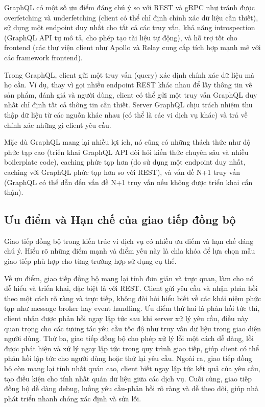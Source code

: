 GraphQL có một số ưu điểm đáng chú ý so với REST và gRPC như tránh được overfetching và underfetching (client có thể chỉ định chính xác dữ liệu cần thiết), sử dụng một endpoint duy nhất cho tất cả các truy vấn, khả năng introspection (GraphQL API tự mô tả, cho phép tạo tài liệu tự động), và hỗ trợ tốt cho frontend (các thư viện client như Apollo và Relay cung cấp tích hợp mạnh mẽ với các framework frontend).

Trong GraphQL, client gửi một truy vấn (query) xác định chính xác dữ liệu mà họ cần. Ví dụ, thay vì gọi nhiều endpoint REST khác nhau để lấy thông tin về sản phẩm, đánh giá và người dùng, client có thể gửi một truy vấn GraphQL duy nhất chỉ định tất cả thông tin cần thiết. Server GraphQL chịu trách nhiệm thu thập dữ liệu từ các nguồn khác nhau (có thể là các vi dịch vụ khác) và trả về chính xác những gì client yêu cầu.

Mặc dù GraphQL mang lại nhiều lợi ích, nó cũng có những thách thức như độ phức tạp cao (triển khai GraphQL API đòi hỏi kiến thức chuyên sâu và nhiều boilerplate code), caching phức tạp hơn (do sử dụng một endpoint duy nhất, caching với GraphQL phức tạp hơn so với REST), và vấn đề N+1 truy vấn (GraphQL có thể dẫn đến vấn đề N+1 truy vấn nếu không được triển khai cẩn thận).

\subsection{Ưu điểm và Hạn chế của giao tiếp đồng bộ}
Giao tiếp đồng bộ trong kiến trúc vi dịch vụ có nhiều ưu điểm và hạn chế đáng chú ý. Hiểu rõ những điểm mạnh và điểm yếu này là chìa khóa để lựa chọn mẫu giao tiếp phù hợp cho từng trường hợp sử dụng cụ thể.

Về ưu điểm, giao tiếp đồng bộ mang lại tính đơn giản và trực quan, làm cho nó dễ hiểu và triển khai, đặc biệt là với REST. Client gửi yêu cầu và nhận phản hồi theo một cách rõ ràng và trực tiếp, không đòi hỏi hiểu biết về các khái niệm phức tạp như message broker hay event handling. Ưu điểm thứ hai là phản hồi tức thì, client nhận được phản hồi ngay lập tức sau khi server xử lý yêu cầu, điều này quan trọng cho các tương tác yêu cầu tốc độ như truy vấn dữ liệu trong giao diện người dùng. Thứ ba, giao tiếp đồng bộ cho phép xử lý lỗi một cách dễ dàng, lỗi được phát hiện và xử lý ngay lập tức trong quy trình giao tiếp, giúp client có thể phản hồi lập tức cho người dùng hoặc thử lại yêu cầu. Ngoài ra, giao tiếp đồng bộ còn mang lại tính nhất quán cao, client biết ngay lập tức kết quả của yêu cầu, tạo điều kiện cho tính nhất quán dữ liệu giữa các dịch vụ. Cuối cùng, giao tiếp đồng bộ dễ dàng debug, luồng yêu cầu-phản hồi rõ ràng và dễ theo dõi, giúp nhà phát triển nhanh chóng xác định và sửa lỗi.

